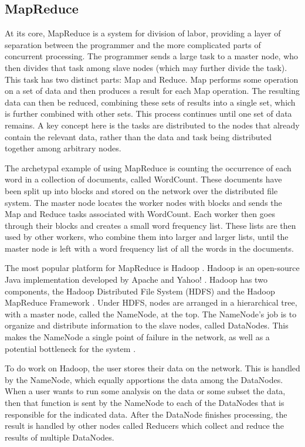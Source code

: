 \subsection{MapReduce}
At its core, MapReduce \cite{mapreduce} is a system for division of labor, providing a layer of separation between the programmer and the more complicated parts of concurrent processing.  The programmer sends a large task to a master node, who then divides that task among slave nodes (which may further divide the task).  This task has two distinct parts: Map and Reduce.  Map performs some operation on a set of data and then produces a result for each Map operation.  The resulting data can then be reduced, combining these sets of results into a single set, which is further combined with other sets.  This process continues until one set of data remains.  A key concept here is the tasks are distributed to the nodes that already contain the relevant data, rather than the data and task being distributed together among arbitrary nodes.

The archetypal example of using MapReduce is counting the occurrence of each word in a collection of documents, called WordCount.  These documents have been split up into blocks and stored on the network over the distributed file system.  The master node locates the worker nodes with blocks and sends the Map and Reduce tasks associated with WordCount.  Each worker then goes through their blocks and creates a small word frequency list.  These lists are then used by other workers, who combine them into larger and larger lists, until the master node is left with a word frequency list of all the words in the documents. 


The most popular platform for MapReduce is Hadoop \cite{Hadoop}. Hadoop is an open-source Java implementation developed by Apache and Yahoo! \cite{pavlo2009comparison}.  Hadoop has two components, the Hadoop Distributed File System (HDFS) \cite{hdfs} and the Hadoop MapReduce Framework \cite{mrsurvey}.  Under HDFS, nodes are arranged in a hierarchical tree, with a master node, called the NameNode, at the top.  The NameNode's job is to organize and distribute information to the slave nodes, called DataNodes.  This makes the NameNode a single point of failure \cite{shvachko2010hadoop} in the network, as well as a potential bottleneck for the system \cite{hadoop-bottle}.

To do work on Hadoop, the user stores their data on the network.  This is handled by the NameNode, which equally apportions the data among the DataNodes.  When a user wants to run some analysis on the data or some subset the data, then that function is sent by the NameNode to each of the DataNodes that is responsible for the indicated data.   After the DataNode finishes processing, the result is handled by other nodes called Reducers which collect and reduce the results of multiple DataNodes.


